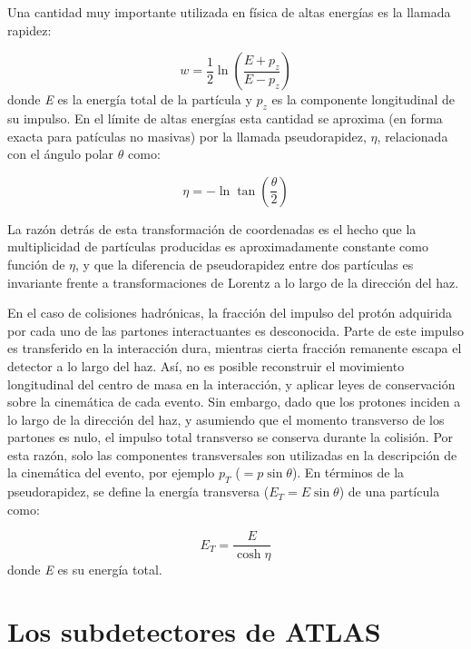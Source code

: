 Una cantidad muy importante utilizada en física de altas energías es la llamada rapidez:

\begin{equation}
w=\frac{1}{2}\ln\left( \frac{E+p_{z}}{E-p_{z}}\right)
\end{equation}
donde \textit{E} es la energía total de la partícula y $p_{z}$ es la componente longitudinal de su impulso. En el límite de altas energías esta cantidad se aproxima (en forma exacta para patículas no masivas) por la llamada pseudorapidez, $\eta$, relacionada con el ángulo polar $\theta$ como:

\begin{equation}
\eta =-\ln \tan\left( \frac{\theta}{2} \right)
\end{equation}

La razón detrás de esta transformación de coordenadas es el hecho que la multiplicidad de partículas producidas es aproximadamente constante como función de $\eta$, y que la diferencia de pseudorapidez entre dos partículas es invariante frente a transformaciones de Lorentz a lo largo de la dirección del haz. 

En el caso de colisiones hadrónicas, la fracción del impulso del protón adquirida por cada uno de las partones interactuantes es desconocida. Parte de este impulso es transferido en la interacción dura, mientras cierta fracción remanente escapa el detector a lo largo del haz. Así, no es posible reconstruir el movimiento longitudinal del centro de masa en la interacción, y aplicar leyes de conservación sobre la cinemática de cada evento. Sin embargo, dado que los protones inciden a lo largo de la dirección del haz, y asumiendo que el momento transverso de los partones es nulo, el impulso total transverso se conserva durante la colisión. Por esta razón, solo las componentes transversales son utilizadas en la descripción de la cinemática del evento, por ejemplo $p_{T}$ ($=p\sin\theta$). En términos de la pseudorapidez, se define la energía transversa ($E_{T}=E\sin\theta$) de una partícula como:

\begin{equation}
E_{T}=\frac{E}{\cosh \eta}
\end{equation}
donde \textit{E} es su energía total.

\section{Los subdetectores de ATLAS}

